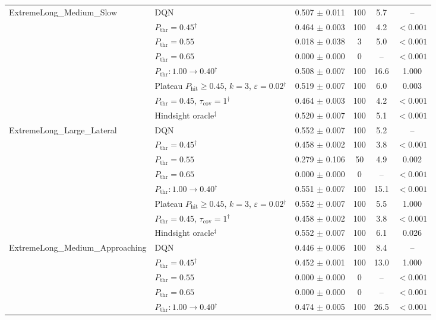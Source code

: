 \begin{table}[htbp]
\begin{tabular}{llcccc}
\midrule
\multirow{8}{*}{ExtremeLong\_Medium\_Slow} & DQN & 0.507 $\pm$ 0.011 & 100 & 5.7 & -- \\
 & $P_{\mathrm{thr}}=0.45$$^{\dagger}$ & 0.464 $\pm$ 0.003 & 100 & 4.2 & $<0.001$ \\
 & $P_{\mathrm{thr}}=0.55$ & 0.018 $\pm$ 0.038 & 3 & 5.0 & $<0.001$ \\
 & $P_{\mathrm{thr}}=0.65$ & 0.000 $\pm$ 0.000 & 0 & -- & $<0.001$ \\
 & $P_{\mathrm{thr}}: 1.00 \to 0.40$$^{\dagger}$ & 0.508 $\pm$ 0.007 & 100 & 16.6 & 1.000 \\
 & Plateau $P_{\mathrm{hit}}\geq0.45$, $k=3$, $\varepsilon=0.02$$^{\dagger}$ & 0.519 $\pm$ 0.007 & 100 & 6.0 & 0.003 \\
 & $P_{\mathrm{thr}}=0.45$, $\tau_{\mathrm{cov}}=1$$^{\dagger}$ & 0.464 $\pm$ 0.003 & 100 & 4.2 & $<0.001$ \\
 & Hindsight oracle$^{\ddagger}$ & 0.520 $\pm$ 0.007 & 100 & 5.1 & $<0.001$ \\
\midrule
\multirow{8}{*}{ExtremeLong\_Large\_Lateral} & DQN & 0.552 $\pm$ 0.007 & 100 & 5.2 & -- \\
 & $P_{\mathrm{thr}}=0.45$$^{\dagger}$ & 0.458 $\pm$ 0.002 & 100 & 3.8 & $<0.001$ \\
 & $P_{\mathrm{thr}}=0.55$ & 0.279 $\pm$ 0.106 & 50 & 4.9 & 0.002 \\
 & $P_{\mathrm{thr}}=0.65$ & 0.000 $\pm$ 0.000 & 0 & -- & $<0.001$ \\
 & $P_{\mathrm{thr}}: 1.00 \to 0.40$$^{\dagger}$ & 0.551 $\pm$ 0.007 & 100 & 15.1 & $<0.001$ \\
 & Plateau $P_{\mathrm{hit}}\geq0.45$, $k=3$, $\varepsilon=0.02$$^{\dagger}$ & 0.552 $\pm$ 0.007 & 100 & 5.5 & 1.000 \\
 & $P_{\mathrm{thr}}=0.45$, $\tau_{\mathrm{cov}}=1$$^{\dagger}$ & 0.458 $\pm$ 0.002 & 100 & 3.8 & $<0.001$ \\
 & Hindsight oracle$^{\ddagger}$ & 0.552 $\pm$ 0.007 & 100 & 6.1 & 0.026 \\
\midrule
\multirow{8}{*}{ExtremeLong\_Medium\_Approaching} & DQN & 0.446 $\pm$ 0.006 & 100 & 8.4 & -- \\
 & $P_{\mathrm{thr}}=0.45$$^{\dagger}$ & 0.452 $\pm$ 0.001 & 100 & 13.0 & 1.000 \\
 & $P_{\mathrm{thr}}=0.55$ & 0.000 $\pm$ 0.000 & 0 & -- & $<0.001$ \\
 & $P_{\mathrm{thr}}=0.65$ & 0.000 $\pm$ 0.000 & 0 & -- & $<0.001$ \\
 & $P_{\mathrm{thr}}: 1.00 \to 0.40$$^{\dagger}$ & 0.474 $\pm$ 0.005 & 100 & 26.5 & $<0.001$ \\

\end{tabular}
\end{table}
